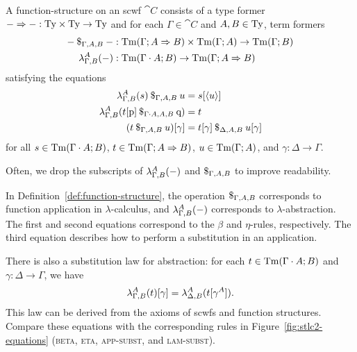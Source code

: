 \begin{defn} \label{def:function-structure}
A function-structure on an scwf $\cat{C}$ consists of a type former $\Sfuncty{-}{-} : \cartprod{\STy}{\STy} \to \STy$ and for each $\Gamma \in \cat{C}$ and $A, B \in \STy$, term formers
\begin{align*}
\Sapp[\Gamma, A, B]{-}{-} &: \cartprod{\STm[\Gamma]{\Sfuncty{A}{B}}}{\STm[\Gamma]{A}} \to \STm[\Gamma]{B} \\
\Slam{A}[\Gamma, B]{-} &: \STm[\Sextcon{\Gamma}{A}]{B} \to \STm[\Gamma]{\Sfuncty{A}{B}}
\end{align*}
satisfying the equations
\begin{align}
\Sapp[\Gamma, A, B]{\Slam{A}[\Gamma, B]{s}}{u}
    &= \Ssubst{s}{\Ssingsub{u}} \label{eq:scwf-beta} \\
\Slam{A}[\Gamma, B]{\Sapp[\Sextcon{\Gamma}{A}, A, B]{\Ssubst{t}{\Spsub}}{\Sq}}
    &= t \label{eq:scwf-eta} \\
\Ssubst{(\Sapp[\Gamma, A, B]{t}{u})}{\gamma}
    &= \Sapp[\Delta, A, B]{\Ssubst{t}{\gamma}}{\Ssubst{u}{\gamma}} \label{eq:scwf-app-subst}
\end{align}
for all $s \in \STm[\Sextcon{\Gamma}{A}]{B}$, $t \in \STm[\Gamma]{\Sfuncty{A}{B}}$, $u \in \STm[\Gamma]{A}$, and $\gamma : \Delta \to \Gamma$.
\end{defn}

Often, we drop the subscripts of $\Slam{A}[\Gamma, B]{-}$ and $\Sapp[\Gamma, A, B]{}{}$ to improve readability.

In Definition~\ref{def:function-structure}, the operation $\Sapp[\Gamma, A, B]{}{}$ corresponds to function application in $\lambda$-calculus, and $\Slam{A}[\Gamma,B]{-}$ corresponds to $\lambda$-abstraction. The first and second equations correspond to the $\beta$ and $\eta$-rules, respectively. The third equation describes how to perform a substitution in an application.

There is also a substitution law for abstraction: for each $t \in \STm[\Sextcon{\Gamma}{A}]{B}$ and $\gamma : \Delta \to \Gamma$, we have
\begin{equation} \label{eq:scwf-lam-subst}
\Ssubst{\Slam{A}[\Gamma, B]{t}}{\gamma} = \Slam{A}[\Delta, B]{\Ssubst{t}{\Sliftsub[A]{\gamma}}}.
\end{equation}
This law can be derived from the axioms of scwfs and function structures. Compare these equations with the corresponding rules in Figure~\ref{fig:stlc2-equations} (\textsc{beta}, \textsc{eta}, \textsc{app-subst}, and \textsc{lam-subst}).

